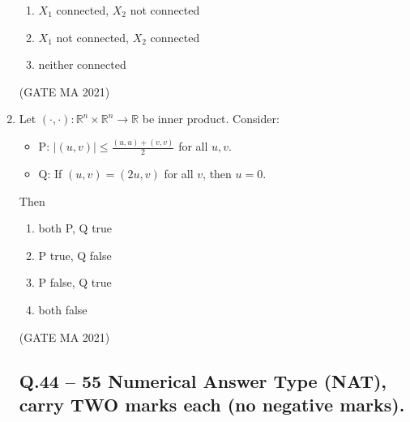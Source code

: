 \documentclass[journal,12pt,onecolumn]{IEEEtran}
\theoremstyle{remark}
\begin{document}
\begin{enumerate}
\begin{enumerate}
        \item $X_1$ connected, $X_2$ not connected
        \item $X_1$ not connected, $X_2$ connected
        \item neither connected
    \end{enumerate}
\hfill(GATE MA 2021)
    \item Let $(\cdot,\cdot): \mathbb{R}^n \times \mathbb{R}^n \to \mathbb{R}$ be inner product. Consider:
    \begin{itemize}
        \item P: $|(u,v)| \leq \frac{(u,u) + (v,v)}{2}$ for all $u,v$.
        \item Q: If $(u,v) = (2u,v)$ for all $v$, then $u=0$.
    \end{itemize}
    Then
    \begin{enumerate}
        \item both P, Q true
        \item P true, Q false
        \item P false, Q true
        \item both false
    \end{enumerate}
\hfill(GATE MA 2021)



\subsection*{Q.44 -- 55 Numerical Answer Type (NAT), carry TWO marks each (no negative marks).}


\end{enumerate}
\end{document}

